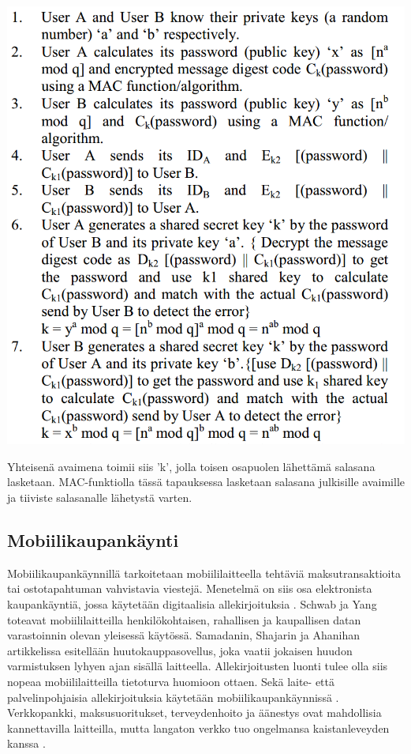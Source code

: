 \documentclass[finnish]{tktltiki2}
\theoremstyle{definition}
\theoremstyle{remark}
\begin{document}
\includegraphics[scale=0.5]{MAC-salasana}

Yhteisenä avaimena toimii siis 'k', jolla toisen osapuolen lähettämä salasana lasketaan. MAC-funktiolla tässä tapauksessa lasketaan salasana julkisille avaimille ja tiiviste salasanalle lähetystä varten.




\subsection{Mobiilikaupankäynti}

Mobiilikaupankäynnillä tarkoitetaan mobiililaitteella tehtäviä maksutransaktioita tai ostotapahtuman vahvistavia viestejä. Menetelmä on siis osa elektronista kaupankäyntiä, jossa käytetään digitaalisia allekirjoituksia \cite{e-c}. Schwab ja Yang toteavat  \cite{enti} mobiililaitteilla henkilökohtaisen, rahallisen ja kaupallisen datan varastoinnin olevan yleisessä käytössä. Samadanin, Shajarin ja Ahanihan artikkelissa \cite{proxy} esitellään huutokauppasovellus, joka vaatii jokaisen huudon varmistuksen lyhyen ajan sisällä laitteella. Allekirjoitusten luonti tulee olla siis nopeaa mobiililaitteilla tietoturva huomioon ottaen. Sekä laite- että palvelinpohjaisia allekirjoituksia käytetään mobiilikaupankäynnissä \cite{proxy}. Verkkopankki, maksusuoritukset, terveydenhoito ja äänestys ovat mahdollisia kannettavilla laitteilla, mutta langaton verkko tuo ongelmansa kaistanleveyden kanssa \cite{ECC}. 
\end{document}
